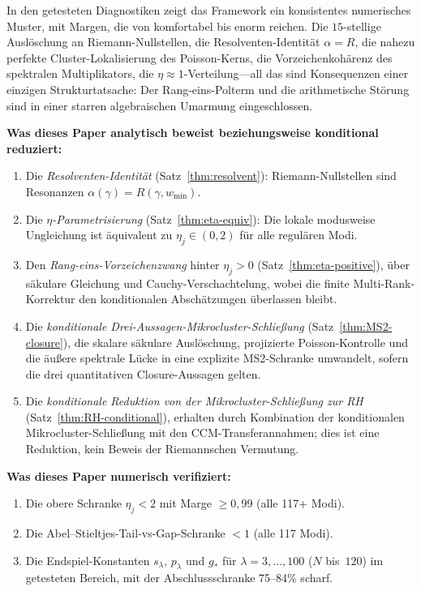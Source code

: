 \documentclass[12pt,a4paper]{article}
\theoremstyle{definition}
\theoremstyle{remark}
\newcommand{\wmin}{w_{\min}}
\begin{document}
In den getesteten Diagnostiken zeigt das Framework ein konsistentes
numerisches Muster, mit Margen, die von komfortabel bis enorm reichen.
Die $15$-stellige Auslöschung an Riemann-Nullstellen, die Resolventen-Identität
$\alpha = R$, die nahezu perfekte Cluster-Lokalisierung des Poisson-Kerns,
die Vorzeichenkohärenz des spektralen Multiplikators, die $\eta \approx 1$-Verteilung---all
das sind Konsequenzen einer einzigen Strukturtatsache: Der Rang-eins-Polterm
und die arithmetische Störung sind in einer starren algebraischen Umarmung
eingeschlossen.

\medskip
\noindent\textbf{Was dieses Paper analytisch beweist beziehungsweise konditional reduziert:}
\begin{enumerate}[label=(\roman*)]
\item Die \emph{Resolventen-Identität} (Satz~\ref{thm:resolvent}):
  Riemann-Nullstellen sind Resonanzen $\alpha(\gamma) = R(\gamma, \wmin)$.
\item Die \emph{$\eta$-Parametrisierung} (Satz~\ref{thm:eta-equiv}):
  Die lokale modusweise Ungleichung ist äquivalent zu $\eta_j \in (0,2)$
  für alle regulären Modi.
\item Den \emph{Rang-eins-Vorzeichenzwang} hinter $\eta_j > 0$
  (Satz~\ref{thm:eta-positive}), über säkulare Gleichung und
  Cauchy-Verschachtelung, wobei die finite Multi-Rank-Korrektur den
  konditionalen Abschätzungen überlassen bleibt.
\item Die \emph{konditionale Drei-Aussagen-Mikrocluster-Schließung}
  (Satz~\ref{thm:MS2-closure}), die skalare säkulare Auslöschung,
  projizierte Poisson-Kontrolle und die äußere spektrale Lücke in eine
  explizite MS2-Schranke umwandelt, sofern die drei quantitativen
  Closure-Aussagen gelten.
\item Die \emph{konditionale Reduktion von der Mikrocluster-Schließung zur RH}
  (Satz~\ref{thm:RH-conditional}), erhalten durch Kombination der
  konditionalen Mikrocluster-Schließung mit den CCM-Transferannahmen;
  dies ist eine Reduktion, kein Beweis der Riemannschen Vermutung.
\end{enumerate}

\noindent\textbf{Was dieses Paper numerisch verifiziert:}
\begin{enumerate}[label=(\roman*)]
\item Die obere Schranke $\eta_j < 2$ mit Marge $\geq 0{,}99$ (alle 117+ Modi).
\item Die Abel--Stieltjes-Tail-vs-Gap-Schranke $< 1$ (alle 117 Modi).
\item Die Endspiel-Konstanten $s_\lambda$, $p_\lambda$ und $g_*$ für
  $\lambda = 3, \ldots, 100$ ($N$ bis~$120$) im getesteten Bereich,
  mit der Abschlussschranke 75--84\% scharf.
\end{enumerate}
\end{document}
